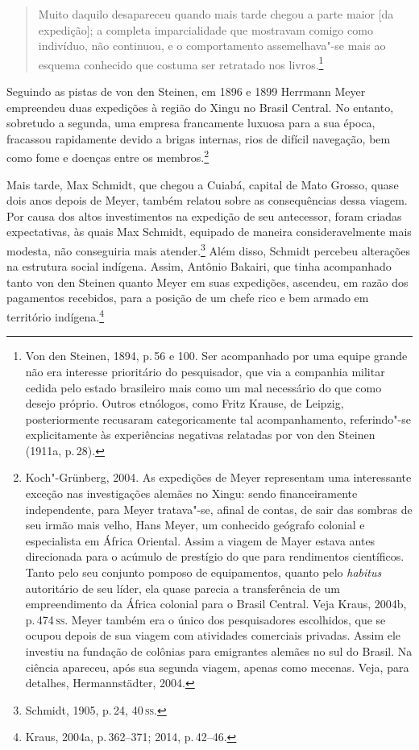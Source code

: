 \begin{quote}Muito daquilo desapareceu quando mais tarde chegou a parte
maior {[}da expedição{]}; a completa imparcialidade que mostravam
comigo como indivíduo, não continuou, e o comportamento assemelhava"-se
mais ao esquema conhecido que costuma ser retratado nos
livros.\footnote{Von den Steinen, 1894, p.\,56 e 100.
Ser acompanhado por uma equipe grande não era
  interesse prioritário do pesquisador, que via a companhia militar
  cedida pelo estado brasileiro mais como um mal necessário do que como
  desejo próprio. Outros etnólogos, como Fritz Krause, de Leipzig,
  posteriormente recusaram categoricamente tal acompanhamento,
  referindo"-se explicitamente às experiências negativas relatadas por
  von den Steinen (1911a, p.\,28).}
\end{quote}

Seguindo as pistas de von den Steinen, em 1896 e 1899 Herrmann Meyer
empreendeu duas expedições à região do Xingu no Brasil
Central. No entanto, sobretudo a segunda, uma empresa francamente
luxuosa para a sua época, fracassou rapidamente devido a brigas
internas, rios de difícil navegação, bem como fome e doenças entre os
membros.\footnote{Koch"-Grünberg, 2004. As expedições de Meyer
  representam uma interessante exceção nas investigações alemães no
  Xingu: sendo financeiramente independente, para Meyer tratava"-se,
  afinal de contas, de sair das sombras de seu irmão mais velho, Hans
  Meyer, um conhecido geógrafo colonial e especialista em África
  Oriental. Assim a viagem de Mayer estava antes direcionada para o
  acúmulo de prestígio do que para rendimentos científicos. Tanto pelo
  seu conjunto pomposo de equipamentos, quanto pelo \textit{habitus}
  autoritário de seu líder, ela quase parecia a transferência de um
  empreendimento da África colonial para o Brasil Central. Veja Kraus,
  2004b, p.\,474\,\textsc{ss}. Meyer também era o único dos pesquisadores
  escolhidos, que se ocupou depois de sua viagem com atividades
  comerciais privadas. Assim ele investiu na fundação de colônias para
  emigrantes alemães no sul do Brasil. Na ciência apareceu, após sua
  segunda viagem, apenas como mecenas. Veja, para detalhes,
  Hermannstädter, 2004.}

Mais tarde, Max Schmidt, que chegou a Cuiabá, capital de Mato Grosso,
quase dois anos depois de Meyer, também relatou sobre as consequências
dessa viagem. Por causa dos altos investimentos na expedição de seu
antecessor, foram criadas expectativas, às quais Max Schmidt, equipado
de maneira consideravelmente mais modesta, não conseguiria mais atender.\footnote{Schmidt, 1905, p.\,24, 40\,\textsc{ss}.} Além disso, Schmidt percebeu alterações
na estrutura social indígena. Assim, Antônio Bakairi, que tinha
acompanhado tanto von den Steinen quanto Meyer em suas expedições,
ascendeu, em razão dos pagamentos recebidos, para a posição de um chefe
rico e bem armado em território indígena.\footnote{Kraus, 2004a, p.\,362--371; 2014, p.\,42--46.}

